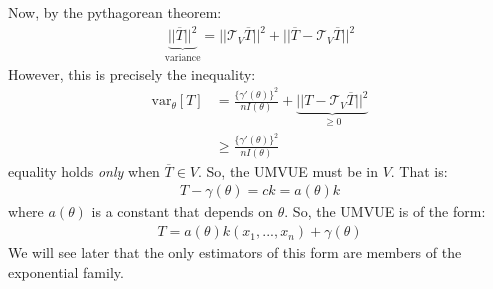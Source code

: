 \documentclass[11pt]{scrartcl}
\theoremstyle{definition}
\theoremstyle{remark}
\begin{document}
Now, by the pythagorean theorem: 
\begin{align*}
	\underbrace{|| \overline{T} ||^2}_{\text{variance}}= || \mathcal{T}_V \overline{T} ||^2 + || \overline{T} - \mathcal{T}_V \overline{T} ||^2	
\end{align*}
However, this is precisely the inequality: 
\begin{align*}
	\text{var}_\theta [T] & = \frac{\{ \gamma'(\theta) \}^2}{n I (\theta)} + \underbrace{|| T - \mathcal{T}_V \overline{T} ||^2 }_{\geq 0} \\
	& \geq \frac{\{ \gamma' (\theta) \}^2}{n I(\theta)}
\end{align*}
equality holds \emph{only} when $\overline{T} \in V$. So, the UMVUE must be in $V$. That is: 
\begin{align*}	
	T - \gamma (\theta)  = ck = a (\theta) k 	
\end{align*}
where $a(\theta)$ is a constant that depends on $\theta$. So, the UMVUE is of the form: 
\begin{align}
	T = a(\theta) k(x_1, ..., x_n) + \gamma (\theta ) 
\end{align}
We will see later that the only estimators of this form are members of the exponential family. 
\end{document}
